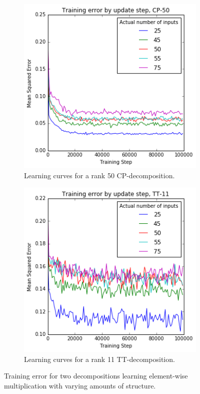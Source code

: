 \begin{figure}
	\begin{subfigure}[t]{0.45\textwidth}
		\includegraphics[width=\textwidth]{tensors/correlatecp50-mom}
		\caption{Learning curves for a rank 50 CP-decomposition.}
	\end{subfigure}
	\hfill
	\begin{subfigure}[t]{0.45\textwidth}
		\includegraphics[width=\textwidth]{tensors/correlatett11-mom}
		\caption{Learning curves for a rank 11 TT-decomposition.}
	\end{subfigure}
	\caption{Training error for two decompositions learning element-wise multiplication with
	 varying amounts of structure.}
	\label{fig:correlate-multiply}
\end{figure}

